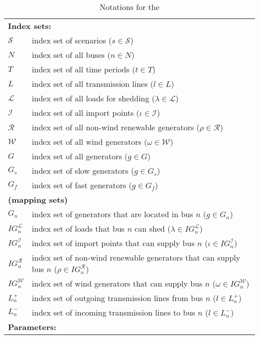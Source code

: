 \begin{table}[H]
	\centering
	\caption{Notations for the \suc}
	\label{SUC:notation}
	\resizebox{\textwidth}{!}
	{
		\begin{tabular}{ll}
			\toprule
			\multicolumn{2}{l}{\textbf{Index sets:}} \\
			$\mathcal{S}$ & index set of scenarios ($s\in\mathcal{S}$) 		\\ 		
			$N$ & index set of all buses ($n\in N$)\\
			$T$ & index set of all time periods ($t\in T$)\\
			$L$ & index set of all transmission lines ($l\in L$) \\
			$\mathcal{L}$ & index set of all loads for shedding ($\lambda \in \mathcal{L}$)\\
			$\mathcal{I}$ & index set of all import points ($\iota\in \mathcal{I}$)\\
			$\mathcal{R}$ & index set of all non-wind renewable generators ($\rho\in \mathcal{R}$)\\
			$\mathcal{W}$ & index set of all wind generators ($\omega\in \mathcal{W}$)\\
			$G$ & index set of all generators ($g\in G$)\\
			$G_s$ & index set of slow generators ($g\in G_s$)\\
			$G_f$ & index set of fast generators ($g\in G_f$)\\
			\multicolumn{2}{l}{\textbf{(mapping sets)}} \\
			$G_n$ & index set of generators that are located in bus $n$ ($g\in G_n$)\\
			$IG_n^\mathcal{L}$ & index set of loads that bus $n$ can shed ($\lambda\in IG_n^\mathcal{L}$)\\
			$IG_n^\mathcal{I}$ & index set of import points that can supply bus $n$ ($\iota\in IG_n^\mathcal{I}$) \\
			$IG_n^\mathcal{R}$ & index set of non-wind renewable generators that can supply bus $n$ ($\rho\in IG_n^\mathcal{R}$) \\
			$IG_n^\mathcal{W}$ & index set of wind generators that can supply bus $n$ ($\omega\in IG_n^\mathcal{W}$)\\
			$L_n^{+}$ & index set of outgoing transmission lines from bus $n$ ($l\in L_n^+$)\\
			$L_n^{-}$ & index set of incoming transmission lines to bus $n$ ($l\in L_n^-$)\\ \midrule
			\multicolumn{2}{l}{\textbf{Parameters:}} \\

\end{tabular}}
\end{table}
